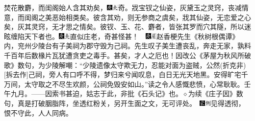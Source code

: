 {焚花散麝，而闺阁始人含其劝矣，{\includegraphics[width=3mm]{../Images/00004}\includegraphics[width=3mm]{../Images/00012}\footnotesize \kaishu 奇。}戕宝钗之仙姿，灰黛玉之灵窍，丧减情意，而闺阁之美恶始相类矣。彼含其劝，则无参商之虞矣，戕其仙姿，无恋爱之心矣，灰其灵窍，无才思之情矣。彼钗、玉、花、麝者，皆张其罗而穴其隧，所以迷眩缠陷天下者也。{\includegraphics[width=3mm]{../Images/00004}\includegraphics[width=3mm]{../Images/00012}\footnotesize \kaishu 直似庄老，奇甚怪甚！　{\includegraphics[width=3mm]{../Images/00004}\includegraphics[width=3mm]{../Images/00010}\footnotesize \kaishu 赵香梗先生《秋树根偶谭》内，兖州少陵台有子美祠为郡守毁为己祠。先生叹子美生遭丧乱，奔走无家，孰料千百年后数椽片瓦犹遭贪吏之毒手。甚矣，才人之厄也！因改公《茅屋为秋风所破歌》数句，为少陵解嘲：“少陵遗像太守欺无力，忍能对面为盗贼，公然{(折克非)}{[}拆去作{]}己祠，旁人有口呼不得，梦归来兮闻叹息，白日无光天地黑。安得旷宅千万间，太守取之不尽生欢颜，公祠免毁安如山。”读之令人感慨悲愤，心常耿耿。壬午九月。------因索书甚迫，姑志于此，非批《石头记》也。{$\diamond$}为续《庄子因》数句，真是打破胭脂阵，坐透红粉关，另开生面之文，无可评处。　}\includegraphics[width=3mm]{../Images/00006}\includegraphics[width=3mm]{../Images/00011}\footnotesize \kaishu 见得透彻，恨不守此，人人同病。}

}
